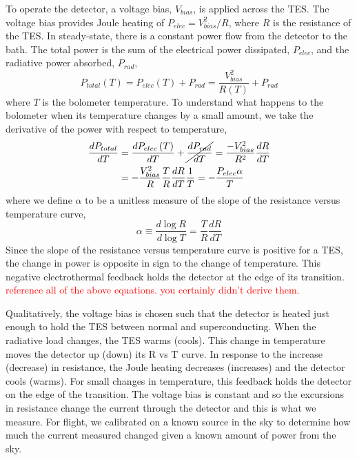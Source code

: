 To operate the detector, a voltage bias, $V_{bias}$, is applied across the \ac{TES}. 
The voltage bias provides Joule heating of $P_{elec} = V^{2}_{bias}/{R}$, where $R$ is the resistance of the \ac{TES}.
In steady-state, there is a constant power flow from the detector to the bath. 
The total power is the sum of the electrical power dissipated, $P_{elec}$, and the radiative power absorbed, $P_{rad}$,
\begin{equation}
P_{total}\left(T\right) = P_{elec}\left(T\right) + P_{rad} = \frac{V^{2}_{bias}}{R\left(T\right)} + P_{rad}
\end{equation}
where $T$ is the bolometer temperature. 
To understand what happens to the bolometer when its temperature changes by a small amount, we take the derivative of the power with respect to temperature, 
\begin{equation}
\begin{split}
\frac{dP_{total}}{dT} & = \frac{dP_{elec}\left(T\right)}{dT} + \cancel{\frac{dP_{rad}}{dT}} = \frac{-V^{2}_{bias}}{R^2} \frac{dR}{dT} \\
& = - \frac{V_{bias}^2}{R} \frac{T}{R} \frac{dR}{dT} \frac{1}{T} = - \frac{P_{elec}\alpha}{T} %
\end{split}
\end{equation}
where we define $\alpha$ to be a unitless measure of the slope of the resistance versus temperature curve,
\begin{equation}
\alpha \equiv \frac{d\log{R}}{d\log{T}} = \frac{T}{R} \frac{dR}{dT}
\end{equation}
Since the slope of the resistance versus temperature curve is positive for a \ac{TES}, the change in power is opposite in sign to the change of temperature. 
This negative electrothermal feedback holds the detector at the edge of its transition. 
\textcolor{red}{reference all of the above equations. you certainly didn't derive them.}

Qualitatively, the voltage bias is chosen such that the detector is heated just enough to hold the \ac{TES} between normal and superconducting. 
When the radiative load changes, the \ac{TES} warms (cools). 
This change in temperature moves the detector up (down) its R vs T curve. 
In response to the increase (decrease) in resistance, the Joule heating decreases (increases) and the detector cools (warms). 
For small changes in temperature, this feedback holds the detector on the edge of the transition. 
The voltage bias is constant and so the excursions in resistance change the current through the detector and this is what we measure. 
For flight, we calibrated on a known source in the sky to determine how much the current measured changed given a known amount of power from the sky.   


